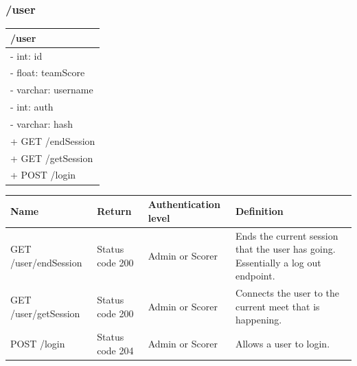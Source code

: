 \documentclass[letterpaper,10pt,draftclsnofoot,onecolumn,]{article}
\begin{document}
\subsubsection{/user}
\begin{center}
    \begin{tabular}{| p{20em} |}
        \hline
        \textbf{/user} \\
        \hline
        - int: id \\
        - float: teamScore \\
        - varchar: username \\
        - int: auth \\
        - varchar: hash \\
        \hline
        + GET /endSession \\
        + GET /getSession \\
        + POST /login \\
        \hline
    \end{tabular}
\end{center}
\begin{center}
    \begin{tabular}{ | p{15em} | p{8em} | p{7em} | p{20em} | }
        \hline
        \textbf{Name} & \textbf{Return} & \textbf{Authentication level} & \textbf{Definition} \\
        \hline
        GET /user/endSession & Status code 200 & Admin or Scorer & Ends the current session that the user has going. Essentially a log out endpoint. \\
        \hline
        GET /user/getSession & Status code 200 & Admin or Scorer & Connects the user to the current meet that is happening. \\
        \hline
        POST /login & Status code 204 & Admin or Scorer & Allows a user to login. \\
        \hline
    \end{tabular}
\end{center}
\end{document}
